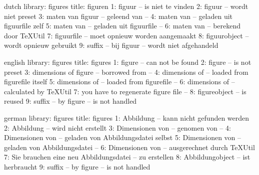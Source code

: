 

\unprotect



\startmessages  dutch  library: figures
   title: figuren
       1: figuur -- is niet te vinden
       2: figuur -- wordt niet preset
       3: maten van figuur -- geleend van --
       4: maten van -- geladen uit figuurfile zelf
       5: maten van -- geladen uit figuurfile --
       6: maten van -- berekend door TeXUtil
       7: figuurfile -- moet opnieuw worden aangemaakt
       8: figuurobject -- wordt opnieuw gebruikt
       9: suffix -- bij figuur -- wordt niet afgehandeld
\stopmessages

\startmessages  english  library: figures
   title: figures
       1: figure -- can not be found
       2: figure -- is not preset
       3: dimensions of figure -- borrowed from --
       4: dimensions of -- loaded from figurefile itself
       5: dimensions of -- loaded from figurefile --
       6: dimensions of -- calculated by TeXUtil
       7: you have to regenerate figure file --
       8: figureobject -- is reused
       9: suffix -- by figure -- is not handled
\stopmessages


\startmessages  german  library: figures
   title: figures
       1: Abbildung -- kann nicht gefunden werden
       2: Abbildung -- wird nicht erstellt
       3: Dimensionen von -- genomen von --
       4: Dimensionen von -- geladen von Abbildungsdatei selbst
       5: Dimensionen von -- geladen von Abbildungsdatei --
       6: Dimensionen von -- ausgerechnet durch TeXUtil
       7: Sie brauchen eine neu Abbildungsdatei -- zu erstellen
       8: Abbildungobject -- ist herbraucht
       9: suffix -- by figure -- is not handled
\stopmessages


